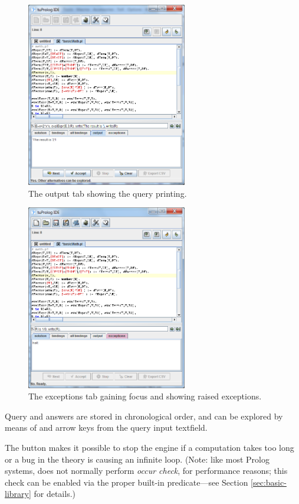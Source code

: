 \begin{figure}
\centering
\includegraphics[width=7cm]{images/gui-output}
\caption{The output tab showing the query printing.}
\label{fig:gui-output}
\end{figure}

\begin{figure}
\centering
\includegraphics[width=7cm]{images/gui-exceptions}
\caption{The exceptions tab gaining focus and showing raised exceptions.}
\label{fig:gui-exceptions}
\end{figure}
Query and answers are stored in chronological order, and can be explored by means of  and  arrow keys from the query input textfield.

The  button makes it possible to stop the engine if a computation takes too long or a bug in the theory is causing an infinite loop. (Note: like most Prolog systems, \tuprolog{} does not normally perform \textit{occur check}, for performance reasons; this check can be enabled via the proper built-in predicate---see Section \ref{sec:basic-library} for details.)

